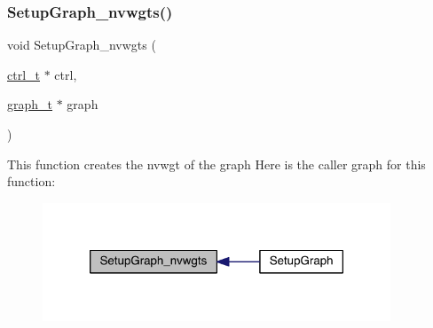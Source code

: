 \subsubsection{\texorpdfstring{Setup\+Graph\+\_\+nvwgts()}{SetupGraph\_nvwgts()}}
{\footnotesize\ttfamily void Setup\+Graph\+\_\+nvwgts (\begin{DoxyParamCaption}\item[{\hyperlink{a00742}{ctrl\+\_\+t} $\ast$}]{ctrl,  }\item[{\hyperlink{a00734}{graph\+\_\+t} $\ast$}]{graph }\end{DoxyParamCaption})}

This function creates the nvwgt of the graph Here is the caller graph for this function\+:\nopagebreak
\begin{figure}[H]
\begin{center}
\leavevmode
\includegraphics[width=294pt]{a00852_adc4ae6f6575afd6ae777f535ea8c439f_icgraph}
\end{center}
\end{figure}
